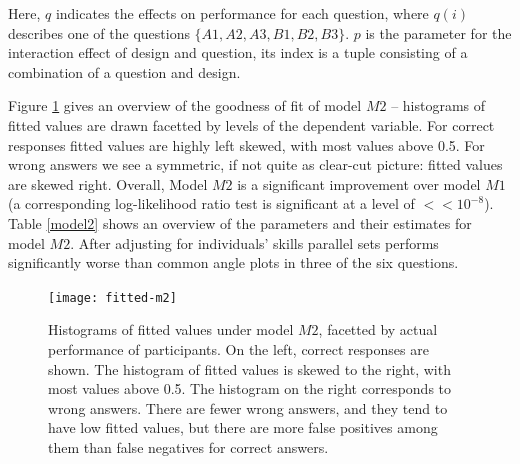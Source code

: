 Here, $q$ indicates the effects on performance for  each question, where $q(i)$ describes one of the questions $\{A1, A2, A3, B1, B2, B3\}$. $p$ is the parameter for the interaction effect of design and question, its index is a tuple consisting of a combination of a question and design. 

Figure \ref{fitted.m2} gives an overview of the goodness of fit of model $M2$ -- histograms of fitted values are drawn facetted by levels of the dependent variable. For correct responses fitted values are highly left skewed, with most values  above 0.5. For wrong answers we see a symmetric, if not quite as clear-cut picture: fitted values are skewed right. 
Overall, Model $M2$ is a significant improvement over model $M1$ (a corresponding log-likelihood ratio test is significant at a level of $<\!\!\!< 10^{-8}$).
Table \ref{model2} shows an overview of the  parameters and their estimates for model $M2$. After adjusting for individuals' skills parallel sets performs significantly worse than common angle plots in three of the six questions. 

\begin{figure}
\texttt{[image: fitted-m2]}
\caption{\label{fitted.m2} Histograms of fitted values under model $M2$, facetted by actual performance of participants. On the left, correct responses are shown. The histogram of fitted values is skewed to the right, with most values above 0.5. The histogram on the right corresponds to wrong answers. There are fewer wrong answers, and they tend to have low fitted values, but there are more false positives among them than false negatives for correct answers. }
\end{figure}

